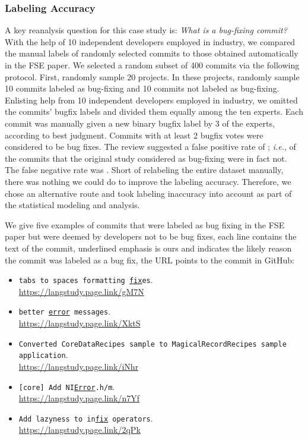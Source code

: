 \documentclass[acmsmall]{acmart}
\newcommand{\gh}{{GitHub}\xspace}
\newcommand{\ie}{\emph{i.e.}\xspace}
\begin{document}
\subsubsection{Labeling Accuracy}\label{falselabels}

A key reanalysis question for this case study is: {\it What is a bug-fixing
  commit?}  With the help of 10 independent developers employed in industry,
we compared the manual labels of randomly selected commits to those obtained
automatically in the FSE paper.  We selected a random subset of 400 commits
via the following protocol. First, randomly sample 20 projects. In these
projects, randomly sample 10 commits labeled as bug-fixing and 10 commits
not labeled as bug-fixing. Enlisting help from 10 independent developers
employed in industry, we omitted the commits' bugfix labels and divided them 
equally among the ten experts. Each commit was manually given a new binary 
bugfix label by 3 of the experts, according to best judgment. Commits
with at least 2 bugfix votes were considered to be bug fixes.  The review
suggested a false positive rate of \commitsFalsePositives; \ie, \commitsFalsePositives of the commits that the
original study considered as bug-fixing were in fact not. The false negative
rate was \commitsFalseNegatives.  Short of relabeling the entire dataset manually, there was
nothing we could do to improve the labeling accuracy. Therefore, we chose an
alternative route and took labeling inaccuracy into account as part of the
statistical modeling and analysis.

We give five examples of commits that were labeled as bug fixing in the FSE
paper but were deemed by developers not to be bug fixes, each line contains
the text of the commit, underlined emphasis is ours and indicates the likely
reason the commit was labeled as a bug fix, the URL points to the commit in
\gh:
\begin{itemize}
\item {\tt tabs to spaces formatting \underline{fix}es}.\\ {\small\sf\url{https://langstudy.page.link/gM7N}} 
\item {\tt better \underline{error} messages}.\\ {\small\sf \url{https://langstudy.page.link/XktS}}
\item {\tt Converted   CoreDataRecipes sample to MagicalRecordRecipes sample application}.\\
 {\small\sf \url{https://langstudy.page.link/iNhr}}
\item {\tt [core] Add  NI\underline{Error}.h/m}.\\{\small\sf\url{https://langstudy.page.link/n7Yf}}
\item {\tt Add lazyness to in\underline{fix} operators}.\\{\small\sf\url{https://langstudy.page.link/2qPk}}
\end{itemize}
\end{document}
